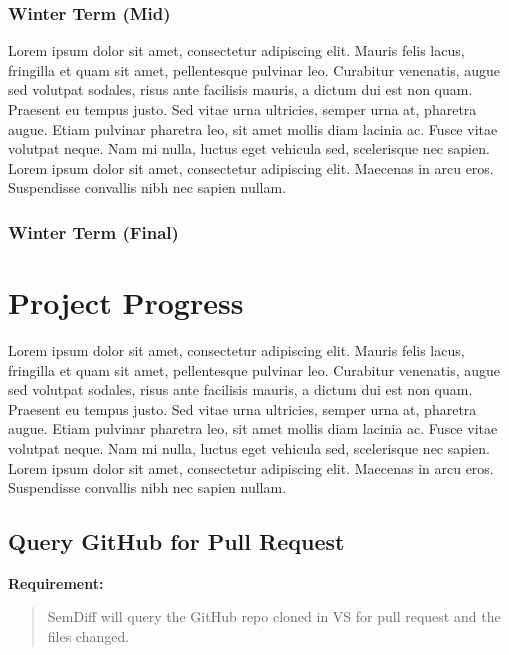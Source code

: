\documentclass[draftclsnofoot,onecolumn]{IEEEtran}
\begin{document}
\subsubsection{Winter Term (Mid)}
Lorem ipsum dolor sit amet, consectetur adipiscing elit. Mauris felis lacus, fringilla et quam sit amet, pellentesque pulvinar leo. Curabitur venenatis, augue sed volutpat sodales, risus ante facilisis mauris, a dictum dui est non quam. Praesent eu tempus justo. Sed vitae urna ultricies, semper urna at, pharetra augue. Etiam pulvinar pharetra leo, sit amet mollis diam lacinia ac. Fusce vitae volutpat neque. Nam mi nulla, luctus eget vehicula sed, scelerisque nec sapien. Lorem ipsum dolor sit amet, consectetur adipiscing elit. Maecenas in arcu eros. Suspendisse convallis nibh nec sapien nullam.

\subsubsection{Winter Term (Final)}










\section{Project Progress}
Lorem ipsum dolor sit amet, consectetur adipiscing elit. Mauris felis lacus, fringilla et quam sit amet, pellentesque pulvinar leo. Curabitur venenatis, augue sed volutpat sodales, risus ante facilisis mauris, a dictum dui est non quam. Praesent eu tempus justo. Sed vitae urna ultricies, semper urna at, pharetra augue. Etiam pulvinar pharetra leo, sit amet mollis diam lacinia ac. Fusce vitae volutpat neque. Nam mi nulla, luctus eget vehicula sed, scelerisque nec sapien. Lorem ipsum dolor sit amet, consectetur adipiscing elit. Maecenas in arcu eros. Suspendisse convallis nibh nec sapien nullam.






\subsection{Query GitHub for Pull Request}

\textbf{Requirement:}

\begin{quote}

SemDiff will query the GitHub repo cloned in VS for pull request and the files changed.

\end{quote}
\end{document}

